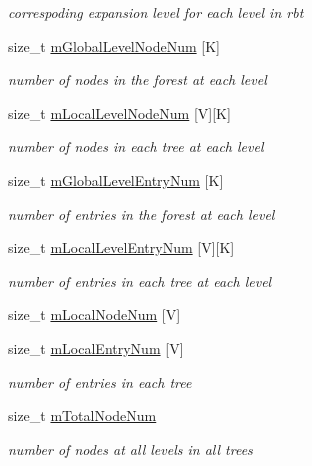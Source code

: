 \begin{DoxyCompactItemize}
\begin{DoxyCompactList}\small\item\em correspoding expansion level for each level in rbt \end{DoxyCompactList}\item 
size\-\_\-t \hyperlink{classRFSTree_a1fb5db4a8ec4c8ab5e89606609054619}{m\-Global\-Level\-Node\-Num} \mbox{[}K\mbox{]}
\begin{DoxyCompactList}\small\item\em number of nodes in the forest at each level \end{DoxyCompactList}\item 
size\-\_\-t \hyperlink{classRFSTree_a18ce6b5d6d9d42b5f7528f13e380b944}{m\-Local\-Level\-Node\-Num} \mbox{[}V\mbox{]}\mbox{[}K\mbox{]}
\begin{DoxyCompactList}\small\item\em number of nodes in each tree at each level \end{DoxyCompactList}\item 
size\-\_\-t \hyperlink{classRFSTree_a22b8577ea6d16ce5008e5969c757b976}{m\-Global\-Level\-Entry\-Num} \mbox{[}K\mbox{]}
\begin{DoxyCompactList}\small\item\em number of entries in the forest at each level \end{DoxyCompactList}\item 
size\-\_\-t \hyperlink{classRFSTree_a4ed6fa6f24399b7a7b9ccb30c208b38f}{m\-Local\-Level\-Entry\-Num} \mbox{[}V\mbox{]}\mbox{[}K\mbox{]}
\begin{DoxyCompactList}\small\item\em number of entries in each tree at each level \end{DoxyCompactList}\item 
size\-\_\-t \hyperlink{classRFSTree_ab92e7b50a603831c0d2f054aab3d19dd}{m\-Local\-Node\-Num} \mbox{[}V\mbox{]}
\item 
size\-\_\-t \hyperlink{classRFSTree_a59097191ae5e2c7984d4f49d1c7835de}{m\-Local\-Entry\-Num} \mbox{[}V\mbox{]}
\begin{DoxyCompactList}\small\item\em number of entries in each tree \end{DoxyCompactList}\item 
size\-\_\-t \hyperlink{classRFSTree_ae0df04978b8fb52d4706716854818eff}{m\-Total\-Node\-Num}
\begin{DoxyCompactList}\small\item\em number of nodes at all levels in all trees \end{DoxyCompactList}\item 

\end{DoxyCompactItemize}

